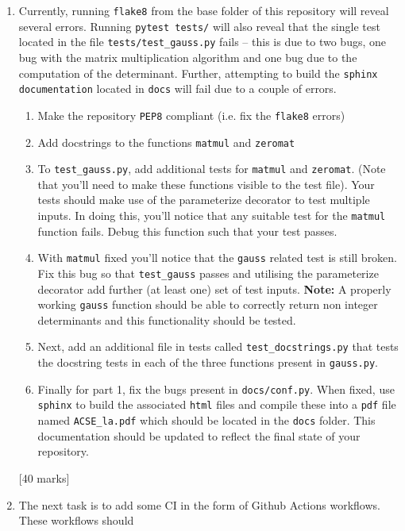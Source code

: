 \documentclass[a4paper,11pt]{article}
\begin{document}
\begin{enumerate}
\item Currently, running \texttt{flake8} from the base folder of this repository will reveal
several errors. Running \texttt{pytest tests/} will also reveal that the single test
located in the file \texttt{tests/test\_gauss.py} fails -- this is due to two bugs, one bug with the matrix
multiplication algorithm and one bug due to the computation of the determinant. Further, attempting to build
the \texttt{sphinx documentation} located in \texttt{docs} will fail due to a couple of errors.
\begin{enumerate}
 \item Make the repository \texttt{PEP8} compliant (i.e. fix the \texttt{flake8} errors)
 \item Add docstrings to the functions \texttt{matmul} and \texttt{zeromat}
 \item To \texttt{test\_gauss.py}, add additional tests for \texttt{matmul} and \texttt{zeromat}.
 (Note that you'll need to make these functions visible to the test file). Your tests
 should make use of the parameterize decorator to test multiple inputs.
 In doing this, you'll notice that any suitable test for the \texttt{matmul} function fails. Debug
 this function such that your test passes.
 \item With \texttt{matmul} fixed you'll notice that the \texttt{gauss} related test is still
 broken. Fix this bug
 so that \texttt{test\_gauss} passes and utilising the parameterize decorator add further (at least one) set of test inputs. \textbf{Note:} A properly working \texttt{gauss} function should be
 able to correctly return non integer determinants and this functionality should be tested.
 \item Next, add an additional file in tests called \newline
 \texttt{test\_docstrings.py} that
 tests the docstring tests in each of the three functions present in \texttt{gauss.py}.
 \item Finally for part 1, fix the bugs present in \texttt{docs/conf.py}. When fixed, use \texttt{sphinx}
 to build the associated \texttt{html} files and compile these into a \texttt{pdf} file named
 \texttt{ACSE\_la.pdf} which should be located in the \texttt{docs} folder. This documentation
 should be updated to reflect the final state of your repository.
\end{enumerate}
[40 marks]
\item The next task is to add some CI in the form of Github Actions workflows. These workflows should

\end{enumerate}
\end{document}
